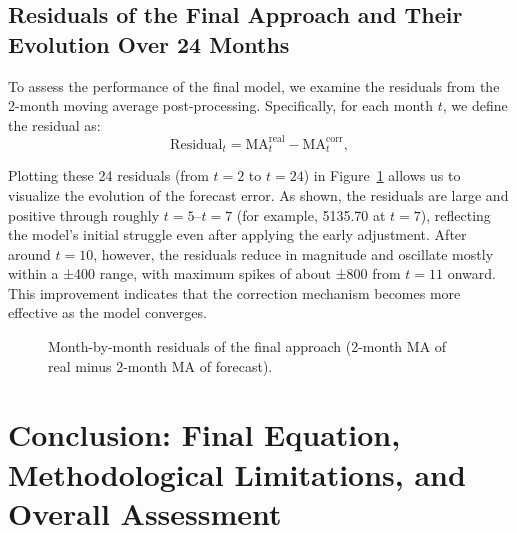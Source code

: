 \documentclass[10pt]{article}
\begin{document}
\subsection{Residuals of the Final Approach and Their Evolution Over 24 Months}
To assess the performance of the final model, we examine the residuals from the 2-month moving average post-processing. Specifically, for each month \(t\), we define the residual as:
\[
\text{Residual}_t = \text{MA}_t^{\mathrm{real}} - \text{MA}_t^{\mathrm{corr}},
\]

Plotting these 24 residuals (from \(t=2\) to \(t=24\)) in Figure~\ref{fig:residuals_24final} allows us to visualize the evolution of the forecast error. As shown, the residuals are large and positive through roughly \(t=5\)–\(t=7\) (for example, 5135.70 at \(t=7\)), reflecting the model’s initial struggle even after applying the early adjustment. After around \(t=10\), however, the residuals reduce in magnitude and oscillate mostly within a ±400 range, with maximum spikes of about ±800 from \(t=11\) onward. This improvement indicates that the correction mechanism becomes more effective as the model converges.

\begin{figure}[H]
\centering
{}
\caption{Month-by-month residuals of the final approach (2-month MA of real minus 2-month MA of forecast).}
\label{fig:residuals_24final}
\end{figure}

\vspace{2mm}
\section{Conclusion: Final Equation, Methodological Limitations, and Overall Assessment}
\label{sec:final_conclusion}
\end{document}
